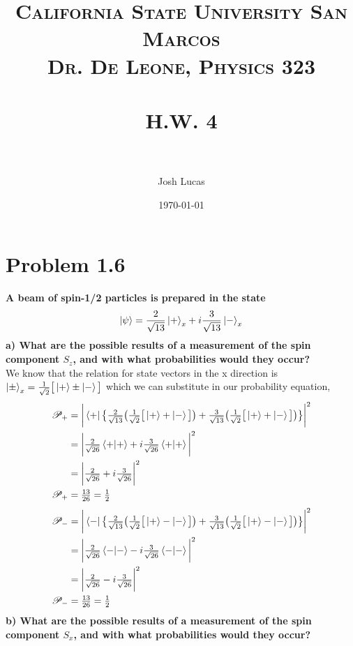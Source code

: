 \documentclass[paper=a4, fontsize=11pt]{scrartcl} %
\title{	
\normalfont \normalsize 
\textsc{California State University San Marcos \\ Dr. De Leone, Physics 323} \\ [25pt] %
\horrule{0.5pt} \\[0.4cm] %
\huge H.W. 4 \\ %
\horrule{2pt} \\[0.5cm] %
}
\author{Josh Lucas} %
\date{\normalsize\today} %
\numberwithin{equation}{section} %
\numberwithin{figure}{section} %
\numberwithin{table}{section} %
\begin{document}
\maketitle %


\section*{Problem 1.6}
\textbf{A beam of spin-1/2 particles is prepared in the state}
$$ \ket{\psi} = \frac{2}{\sqrt{13}} \ket{+}_x + i \frac{3}{\sqrt{13}} \ket{-}_x$$
\textbf{a) What are the possible results of a measurement of the spin component $S_z$, and with what probabilities would they occur?}\\
We know that the relation for state vectors in the x direction is  $\ket{\pm}_x = \frac{1}{\sqrt{2}} \big [ \ket{+} \pm \ket{-} \big ]$ which we can substitute in our probability equation,
\begin{align*}
\mathscr{P_+} & = \bigg | \bra{+} \big \{ \tfrac{2}{\sqrt{13}} \big ( \tfrac{1}{\sqrt{2}} \big [ \ket{+} + \ket{-} \big ] \big ) +  \tfrac{3}{\sqrt{13}} \big ( \tfrac{1}{\sqrt{2}}   \big [ \ket{+} + \ket{-}  \big ]\big ) \big \} \bigg |^2 \\
& = \bigg |  \tfrac{2}{\sqrt{26}} \braket{+|+} + i\tfrac{3}{\sqrt{26}} \braket{+|+} \bigg |^2 \\
& = \bigg | \tfrac{2}{\sqrt{26}} + i\tfrac{3}{\sqrt{26}} \bigg |^2 \\
\mathscr{P_+} & = \tfrac{13}{26} = \tfrac{1}{2}
\end{align*}
\begin{align*}
\mathscr{P_-} & = \bigg | \bra{-} \big \{ \tfrac{2}{\sqrt{13}} \big ( \tfrac{1}{\sqrt{2}} \big [ \ket{+} - \ket{-} \big ] \big ) +  \tfrac{3}{\sqrt{13}} \big ( \tfrac{1}{\sqrt{2}}   \big [ \ket{+} - \ket{-}  \big ]\big ) \big \} \bigg |^2 \\
& = \bigg |  \tfrac{2}{\sqrt{26}} \braket{-|-} - i\tfrac{3}{\sqrt{26}} \braket{-|-} \bigg |^2 \\
& = \bigg | \tfrac{2}{\sqrt{26}} - i\tfrac{3}{\sqrt{26}} \bigg |^2 \\
\mathscr{P_-} & = \tfrac{13}{26} = \tfrac{1}{2}
\end{align*}
\textbf{b) What are the possible results of a measurement of the spin component $S_x$, and with what probabilities would they occur?}
\end{document}
